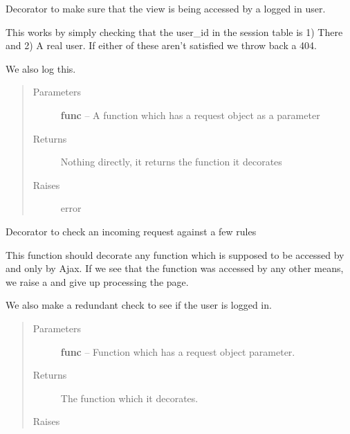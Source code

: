 \documentclass[letterpaper,10pt,english]{sphinxmanual}
\begin{document}

\begin{fulllineitems}
\label{timetracker:timetracker.utils.decorators.loggedin}
Decorator to make sure that the view is being accessed by a
logged in user.

This works by simply checking that the user\_id in the session
table is 1) There and 2) A real user. If either of these aren't
satisfied we throw back a 404.

We also log this.
\begin{quote}\begin{description}
\item[{Parameters}] \leavevmode
\textbf{func} -- A function which has a request object as a parameter

\item[{Returns}] \leavevmode
Nothing directly, it returns the function it decorates

\item[{Raises }] \leavevmode
{} error

\end{description}\end{quote}

\end{fulllineitems}


\begin{fulllineitems}
\label{timetracker:timetracker.utils.decorators.request_check}
Decorator to check an incoming request against a few rules

This function should decorate any function which is supposed
to be accessed by and only by Ajax. If we see that the function
was accessed by any other means, we raise a 
and give up processing the page.

We also make a redundant check to see if the user is logged in.
\begin{quote}\begin{description}
\item[{Parameters}] \leavevmode
\textbf{func} -- Function which has a request object parameter.

\item[{Returns}] \leavevmode
The function which it decorates.

\item[{Raises }] \leavevmode
{}

\end{description}\end{quote}

\end{fulllineitems}
\end{document}
